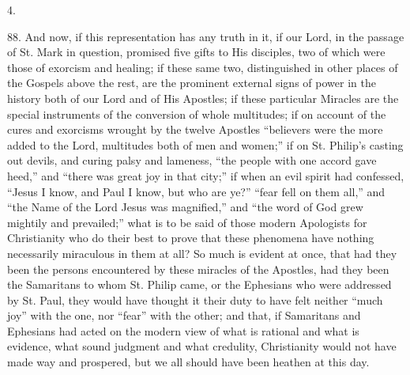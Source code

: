 4.

88.
And now, if this representation has any truth in it, if our Lord, in
the passage of St. Mark in question, promised five gifts to His
disciples, two of which were those of exorcism and healing; if these
same two, distinguished in other places of the Gospels above the rest,
are the prominent external signs of power in the history both of our
Lord and of His Apostles; if these particular Miracles are the special
instruments of the conversion of whole multitudes; if on account of
the cures and exorcisms wrought by the twelve Apostles ``believers were
the more added to the Lord, multitudes both of men and women;'' if on
St. Philip's casting out devils, and curing palsy and lameness, ``the
people with one accord gave heed,'' and ``there was great joy in that
city;'' if when an evil spirit had confessed, ``Jesus I know, and
Paul I know, but who are ye?'' ``fear fell on them all,'' and ``the Name
of the Lord Jesus was magnified,'' and ``the word of God grew mightily
and prevailed;'' what is to be said of those modern Apologists for
Christianity who do their best to prove that these phenomena have
nothing necessarily miraculous in them at all? So much is evident at
once, that had they been the persons encountered by these miracles of
the Apostles, had they been the Samaritans to whom St. Philip came, or
the Ephesians who were addressed by St. Paul, they would have thought
it their duty to have felt neither ``much joy'' with the one, nor ``fear''
with the other; and that, if Samaritans and Ephesians had acted on the
modern view of what is rational and what is evidence, what sound
judgment and what credulity, Christianity would not have made way and
prospered, but we all should have been heathen at this day.

